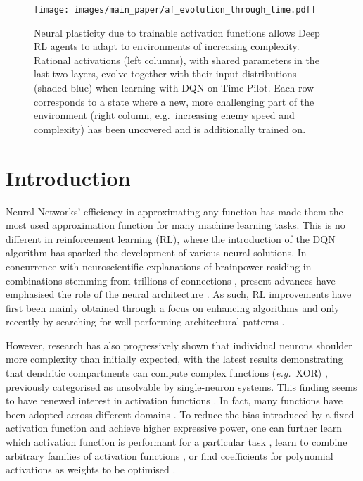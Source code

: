 \documentclass[accepted]{article}
\theoremstyle{plain}
\theoremstyle{definition}
\theoremstyle{remark}
\newcommand{\eg}{\emph{e.g.}~}
\begin{document}
\begin{figure}[t!]
    \centering
    \texttt{[image: images/main\_paper/af\_evolution\_through\_time.pdf]}
    \vspace{-0.3cm}
    \caption{Neural plasticity due to trainable activation functions allows Deep RL agents to adapt to environments of increasing complexity. Rational activations (left columns), with shared parameters in the last two layers, evolve together with their input distributions (shaded blue) when learning with DQN on Time Pilot. Each row corresponds to a state where a new, more challenging part of the environment (right column, e.g.~increasing enemy speed and complexity) has been uncovered and is additionally trained on.}
    \label{fig:evolving_af}    
\end{figure}

\section{Introduction}
Neural Networks' efficiency in approximating any function has made them the most used approximation function for many machine learning tasks. This is no different in reinforcement learning (RL), where the introduction of the DQN algorithm \citep{mnih2015human} has sparked the development of various neural solutions. 
In concurrence with neuroscientific explanations of brainpower residing in combinations stemming from trillions of connections \citep{Garlick2002UnderstandingTN}, present advances have emphasised the role of the neural architecture \citep{liu2018progressive, XieZLL19}. As such, RL improvements have first been mainly obtained through a focus on enhancing algorithms \citep{Mnih2016asynchronous, Haarnoja2018SAC, Banerjee2021ISAC} and only recently by searching for well-performing architectural patterns \citep{miao2021rldarts}. 

However, research has also progressively shown that individual neurons shoulder more complexity than initially expected, with the latest results demonstrating that dendritic compartments can compute complex functions (\eg XOR) \citep{gidon2020dendritic}, previously categorised as unsolvable by single-neuron systems.
This finding seems to have renewed interest in activation functions \citep{georgescu2020non, Misra20mish}. In fact, many functions have been adopted across different domains \citep{RedmonDGF16, BrownMRSKDNSSAA20, SchulmanWDRK17}. To reduce the bias introduced by a fixed activation function and achieve higher expressive power, one can further learn which activation function is performant for a particular task \citep{zoph2016neural, liu2018progressive}, learn to combine arbitrary families of activation functions \citep{manessi2018learning}, or find coefficients for polynomial activations as weights to be optimised \citep{goyal2019learning}. 
\end{document}
